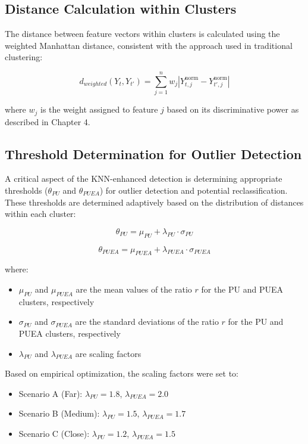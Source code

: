 \subsection{Distance Calculation within Clusters}

The distance between feature vectors within clusters is calculated using the weighted Manhattan distance, consistent with the approach used in traditional clustering:

\begin{equation}
    d_{weighted}(Y_t, Y_{t'}) = \sum_{j=1}^{n} w_j |Y_{t,j}^{\text{norm}} - Y_{t',j}^{\text{norm}}|
\end{equation}

where $w_j$ is the weight assigned to feature $j$ based on its discriminative power as described in Chapter 4.

\subsection{Threshold Determination for Outlier Detection}

A critical aspect of the KNN-enhanced detection is determining appropriate thresholds ($\theta_{PU}$ and $\theta_{PUEA}$) for outlier detection and potential reclassification. These thresholds are determined adaptively based on the distribution of distances within each cluster:

\begin{equation}
    \theta_{PU} = \mu_{PU} + \lambda_{PU} \cdot \sigma_{PU}
\end{equation}

\begin{equation}
    \theta_{PUEA} = \mu_{PUEA} + \lambda_{PUEA} \cdot \sigma_{PUEA}
\end{equation}

where:
\begin{itemize}
    \item $\mu_{PU}$ and $\mu_{PUEA}$ are the mean values of the ratio $r$ for the PU and PUEA clusters, respectively
    \item $\sigma_{PU}$ and $\sigma_{PUEA}$ are the standard deviations of the ratio $r$ for the PU and PUEA clusters, respectively
    \item $\lambda_{PU}$ and $\lambda_{PUEA}$ are scaling factors
\end{itemize}

Based on empirical optimization, the scaling factors were set to:
\begin{itemize}
    \item Scenario A (Far): $\lambda_{PU} = 1.8$, $\lambda_{PUEA} = 2.0$
    \item Scenario B (Medium): $\lambda_{PU} = 1.5$, $\lambda_{PUEA} = 1.7$
    \item Scenario C (Close): $\lambda_{PU} = 1.2$, $\lambda_{PUEA} = 1.5$
\end{itemize}

